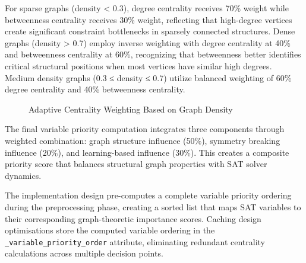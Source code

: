 For sparse graphs (density < 0.3), degree centrality receives 70\% weight while betweenness centrality receives 30\% weight, reflecting that high-degree vertices create significant constraint bottlenecks in sparsely connected structures. Dense graphs (density > 0.7) employ inverse weighting with degree centrality at 40\% and betweenness centrality at 60\%, recognizing that betweenness better identifies critical structural positions when most vertices have similar high degrees. Medium density graphs (0.3 ≤ density ≤ 0.7) utilize balanced weighting of 60\% degree centrality and 40\% betweenness centrality.

\begin{figure}[htbp]
\centering
{}
\caption{Adaptive Centrality Weighting Based on Graph Density}
\label{fig:adaptive-weighting}
\end{figure}

The final variable priority computation integrates three components through weighted combination: graph structure influence (50\%), symmetry breaking influence (20\%), and learning-based influence (30\%). This creates a composite priority score that balances structural graph properties with SAT solver dynamics.

The implementation design pre-computes a complete variable priority ordering during the preprocessing phase, creating a sorted list that maps SAT variables to their corresponding graph-theoretic importance scores. Caching design optimisations store the computed variable ordering in the \texttt{\_variable\_priority\_order} attribute, eliminating redundant centrality calculations across multiple decision points.

